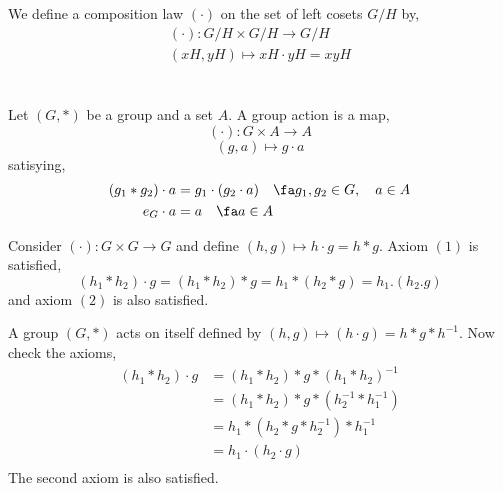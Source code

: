 \documentclass{article}
\begin{document}
\subsection[Quotient Groups]{}

\begin{ndefi}
  We define a composition law $(\cdot)$ on the set of left cosets $G/H$ by,
  \begin{align*}
    (\cdot) : G/H \times G/H \to G/H\\
    (xH, yH) \mapsto xH \cdot yH = xyH
  \end{align*}
\end{ndefi}

\subsubsection[First Isomorphism Theorem]{}

\section[Group Actions]{}

\begin{ndefi}
  Let $(G, *)$ be a group and a set $A$. A group action is a map,
  $$ (\cdot) : G \times A \to A $$
  $$ (g, a) \mapsto g \cdot a $$
  satisying,
  \begin{align}
    (g_1 * g_2) \cdot a &= g_1 \cdot (g_2 \cdot a) \quad \fa g_1, g_2 \in G, \quad a \in A\\
    e_G \cdot a &= a \quad \fa a\in A
  \end{align}
\end{ndefi}

\begin{ndefi}
  Consider $(\cdot) : G \times G \to G$ and define $(h, g) \mapsto h \cdot g = h * g$. Axiom $(1)$ is satisfied,
  $$ (h_1 * h_2) \cdot g = (h_1 * h_2) * g = h_1 * (h_2 * g) = h_1 . (h_2.g) $$
  and axiom $(2)$ is also satisfied.
\end{ndefi}

\begin{ndefi}
  A group $(G, *)$ acts on itself defined by $(h, g) \mapsto (h \cdot g) = h * g * h^{-1}$. Now check the axioms,
  \begin{align*}
    (h_1 * h_2) \cdot g &= (h_1 * h_2) * g * (h_1 * h_2)^{-1}\\
    &= (h_1 * h_2) * g * (h_2^{-1} * h_1^{-1})\\
    &= h_1 * (h_2 * g * h_2^{-1}) * h_1^{-1}\\
    &= h_1 \cdot (h_2 \cdot g)\\
  \end{align*}
  The second axiom is also satisfied.
\end{ndefi}
\end{document}
